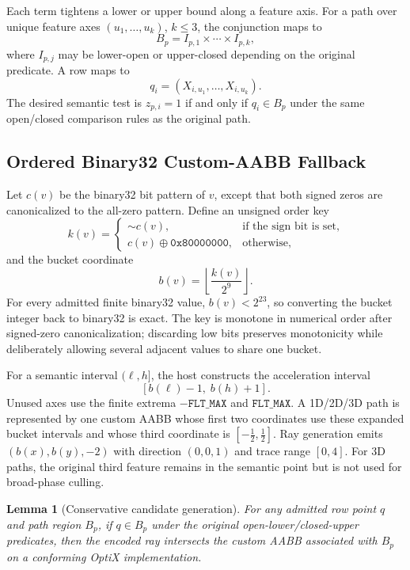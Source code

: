 \documentclass[11pt]{article}
\newtheorem{lemma}{Lemma}
\begin{document}
Each term tightens a lower or upper bound along a feature axis. For a path over
unique feature axes $(u_1,\ldots,u_k)$, $k \le 3$, the conjunction maps to
\[
  B_p = I_{p,1} \times \cdots \times I_{p,k},
\]
where $I_{p,j}$ may be lower-open or upper-closed depending on the original
predicate. A row maps to
\[
  q_i = (X_{i,u_1},\ldots,X_{i,u_k}).
\]
The desired semantic test is $z_{p,i}=1$ if and only if $q_i \in B_p$ under the
same open/closed comparison rules as the original path.

\subsection{Ordered Binary32 Custom-AABB Fallback}

Let $c(v)$ be the binary32 bit pattern of $v$, except that both signed zeros are
canonicalized to the all-zero pattern. Define an unsigned order key
\[
  k(v)=
  \begin{cases}
    \mathop{\sim}c(v), & \text{if the sign bit is set},\\
    c(v)\mathbin{\oplus}\mathtt{0x80000000}, & \text{otherwise,}
  \end{cases}
\]
and the bucket coordinate
\[
  b(v)=\left\lfloor\frac{k(v)}{2^9}\right\rfloor.
\]
For every admitted finite binary32 value, $b(v)<2^{23}$, so converting the
bucket integer back to binary32 is exact. The key is monotone in numerical
order after signed-zero canonicalization; discarding low bits preserves
monotonicity while deliberately allowing several adjacent values to share one
bucket.

For a semantic interval $(\ell,h]$, the host constructs the acceleration
interval
\[
  [b(\ell)-1,\;b(h)+1].
\]
Unused axes use the finite extrema $-\mathtt{FLT\_MAX}$ and
$\mathtt{FLT\_MAX}$. A 1D/2D/3D path is represented by one custom AABB whose
first two coordinates use these expanded bucket intervals and whose third
coordinate is $[-\tfrac12,\tfrac12]$. Ray generation emits
$(b(x),b(y),-2)$ with direction $(0,0,1)$ and trace range $[0,4]$. For 3D
paths, the original third feature remains in the semantic point but is not used
for broad-phase culling.

\begin{lemma}[Conservative candidate generation]
For any admitted row point $q$ and path region $B_p$, if $q\in B_p$ under the
original open-lower/closed-upper predicates, then the encoded ray intersects
the custom AABB associated with $B_p$ on a conforming OptiX implementation.
\end{lemma}
\end{document}
